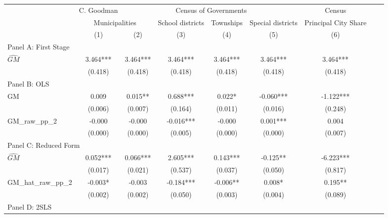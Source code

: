 \begin{tabular}{l*{8}{c}} \toprule
&\multicolumn{1}{c}{C. Goodman}&\multicolumn{4}{c}{Census of Governments}&\multicolumn{1}{c}{Census}\\\cmidrule(lr){2-2}\cmidrule(lr){3-6}\cmidrule(lr){7-7}
&\multicolumn{2}{c}{Municipalities}&\multicolumn{1}{c}{School districts}&\multicolumn{1}{c}{Townships}&\multicolumn{1}{c}{Special districts}&\multicolumn{1}{c}{Principal City Share}\\\cmidrule(lr){2-3}\cmidrule(lr){4-6}\cmidrule(lr){7-7}
&\multicolumn{1}{c}{(1)}&\multicolumn{1}{c}{(2)}&\multicolumn{1}{c}{(3)}&\multicolumn{1}{c}{(4)}&\multicolumn{1}{c}{(5)}&\multicolumn{1}{c}{(6)}\\
\cmidrule(lr){1-7}
\multicolumn{6}{l}{Panel A: First Stage}\\
\cmidrule(lr){1-7}
$\widehat{GM}$  &    3.464***&    3.464***&    3.464***&    3.464***&    3.464***&    3.464***\\
                &  (0.418)   &  (0.418)   &  (0.418)   &  (0.418)   &  (0.418)   &  (0.418)   \\
\cmidrule(lr){1-7}
\multicolumn{6}{l}{Panel B: OLS}\\
\cmidrule(lr){1-7}
GM              &    0.009   &    0.015** &    0.688***&    0.022*  &   -0.060***&   -1.122***\\
                &  (0.006)   &  (0.007)   &  (0.164)   &  (0.011)   &  (0.016)   &  (0.248)   \\
\addlinespace
GM\_raw\_pp\_2     &   -0.000   &   -0.000   &   -0.016***&   -0.000   &    0.001***&    0.004   \\
                &  (0.000)   &  (0.000)   &  (0.005)   &  (0.000)   &  (0.000)   &  (0.007)   \\
\cmidrule(lr){1-7}
\multicolumn{6}{l}{Panel C: Reduced Form}\\
\cmidrule(lr){1-7}
$\widehat{GM}$  &    0.052***&    0.066***&    2.605***&    0.143***&   -0.125** &   -6.223***\\
                &  (0.017)   &  (0.021)   &  (0.537)   &  (0.037)   &  (0.050)   &  (0.817)   \\
\addlinespace
GM\_hat\_raw\_pp\_2 &   -0.003*  &   -0.003   &   -0.184***&   -0.006** &    0.008*  &    0.195** \\
                &  (0.002)   &  (0.002)   &  (0.050)   &  (0.003)   &  (0.004)   &  (0.089)   \\
\cmidrule(lr){1-7}
\multicolumn{6}{l}{Panel D: 2SLS}\\
\cmidrule(lr){1-7}

\end{tabular}
